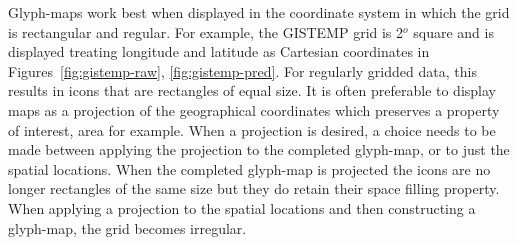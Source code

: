 \documentclass[oneside]{article}
\begin{document}
Glyph-maps work best when displayed in the coordinate system in which the grid is rectangular and regular.  For example, the GISTEMP grid is 2$^o$ square and is displayed treating longitude and latitude as Cartesian coordinates in Figures~\ref{fig:gistemp-raw}, \ref{fig:gistemp-pred}.  For regularly gridded data, this results in icons that are rectangles of equal size.  It is often preferable to display maps as a projection of the geographical coordinates which preserves a property of interest, area for example. When a projection is desired, a choice needs to be made between applying the projection to the completed glyph-map, or to just the spatial locations.  When the completed glyph-map is projected the icons are no longer rectangles of the same size but they do retain their space filling property.  When applying a projection to the spatial locations and then constructing a glyph-map, the grid becomes irregular. 
\end{document}

